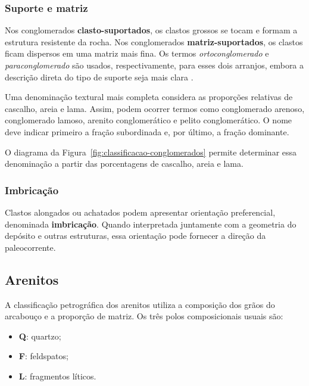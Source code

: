 \subsubsection{Suporte e matriz}

Nos conglomerados \textbf{clasto-suportados}, os clastos grossos se tocam e formam a
estrutura resistente da rocha. Nos conglomerados \textbf{matriz-suportados}, os clastos
ficam dispersos em uma matriz mais fina. Os termos \emph{ortoconglomerado} e
\emph{paraconglomerado} são usados, respectivamente, para esses dois arranjos, embora a
descrição direta do tipo de suporte seja mais clara \parencite{nichols2009}.

Uma denominação textural mais completa considera as proporções relativas de cascalho,
areia e lama. Assim, podem ocorrer termos como conglomerado arenoso, conglomerado
lamoso, arenito conglomerático e pelito conglomerático. O nome deve indicar primeiro a
fração subordinada e, por último, a fração dominante.

O diagrama da Figura~\ref{fig:classificacao-conglomerados} permite determinar essa
denominação a partir das porcentagens de cascalho, areia e lama.



\subsubsection{Imbricação}

Clastos alongados ou achatados podem apresentar orientação preferencial, denominada
\textbf{imbricação}. Quando interpretada juntamente com a geometria do depósito e outras
estruturas, essa orientação pode fornecer a direção da paleocorrente.

\subsection{Arenitos}

A classificação petrográfica dos arenitos utiliza a composição dos grãos do arcabouço e
a proporção de matriz. Os três polos composicionais usuais são:

\begin{itemize}
  \item \textbf{Q}: quartzo;
  \item \textbf{F}: feldspatos;
  \item \textbf{L}: fragmentos líticos.
\end{itemize}

